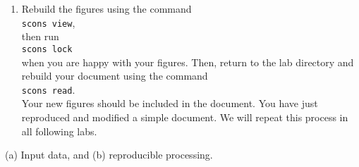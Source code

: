 \begin{enumerate}
\item Rebuild the figures using the command \\
  \texttt{scons view}, \\
  then run \\
  \texttt{scons lock} \\
  when you are happy with your figures. Then, return to the lab
  directory and rebuild your document using the command \\
  \texttt{scons read}. \\
  Your new figures should be included in the document. You have just
  reproduced and modified a simple document. We will repeat this
  process in all following labs.
\end{enumerate}

{(a) Input data, and (b) reproducible processing.}


